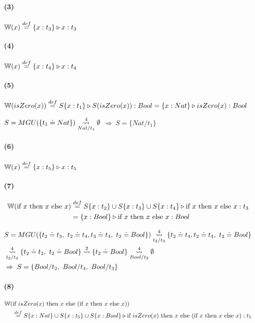 \documentclass[10pt,a4paper]{article}
\begin{document}
\begin{multicols}{2}
\paragraph{(3)} $\WFunc(x) \equalDef \judgeType{\{x:t_3\}}{x}{t_3}$

\paragraph{(4)} $\WFunc(x) \equalDef \judgeType{\{x:t_4\}}{x}{t_4}$
\end{multicols}


\paragraph{(5)} $\WFunc(isZero(x)) \equalDef \judgeType{S\{x:t_1\}}{S(isZero(x))}{Bool} = \judgeType{\{x:Nat\}}{isZero(x)}{Bool}$ 
\begin{centrado}
$S = MGU(\{t_1 \doteq Nat\}) \goesTo{4}{Nat/t_1} \emptyset$ $\Rightarrow~S = \{Nat/t_1\}$
\end{centrado}

\paragraph{(6)} $\WFunc(x) \equalDef \judgeType{\{x:t_5\}}{x}{t_5}$

\paragraph{(7)} 
\begin{align*}
\WFunc(\lambdaIf{x}{x}{x}) &\equalDef \judgeType{S\{x:t_2\}\cup S\{x:t_3\}\cup S\{x:t_4\}}{\lambdaIf{x}{x}{x}}{t_3}\\ &= \judgeType{\{x:Bool\}}{\lambdaIf{x}{x}{x}}{Bool}
\end{align*}

\begin{align*}
&S = MGU(\{t_2 \doteq t_3,~t_2 \doteq t_4, t_3 \doteq t_4,~t_2 \doteq Bool\}) \goesTo{4}{t_2/t_3} \{t_2 \doteq t_4, t_2 \doteq t_4,~t_2 \doteq Bool\} \\ &\goesTo{4}{t_2/t_4} \{t_2 \doteq t_2,~t_2 \doteq Bool\} \goesTo{2}{} \{t_2 \doteq Bool\} \goesTo{4}{Bool/t_2} \emptyset \\
&\Rightarrow~S = \{Bool/t_2,~Bool/t_4,~Bool/t_3\}
\end{align*}


\paragraph{(8)}
\begin{align*}
\WFunc(&\lambdaIf{isZero(x)}{x}{(\lambdaIf{x}{x}{x}})) \\
&\equalDef \judgeType{S\{x:Nat\}\cup S\{x:t_5\}\cup S\{x:Bool\}}{\lambdaIf{isZero(x)}{x}{(\lambdaIf{x}{x}{x}})}{t_5}\\ 
\end{align*}
\end{document}
